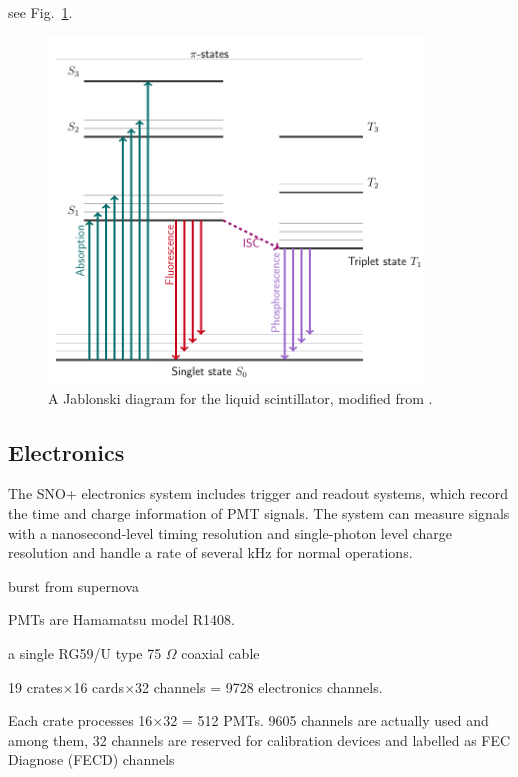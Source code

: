 see Fig.~\ref{jablonski}.
\begin{figure}[!htb]
	\centering
	\includegraphics[width=10cm]{jablonski.png}
	\caption{A Jablonski diagram for the liquid scintillator, modified from \cite{birks1965theory, knoll2010radiation}.}
	\label{jablonski}
\end{figure}











\subsection{Electronics}

The SNO+ electronics system includes trigger and readout systems, which record the time and charge information of PMT signals. The system can measure signals with a nanosecond-level timing resolution and single-photon level charge resolution and handle a rate of several kHz for normal operations.

burst 
from supernova









PMTs are Hamamatsu model R1408.


a single RG59/U type 75 $\Omega$ coaxial cable

19 crates$\times$16 cards$\times$32 channels = 9728 electronics channels.

Each crate processes 16$\times$32 = 512 PMTs.
9605 channels are actually used and among them, 32 channels are reserved for calibration devices and labelled as FEC Diagnose (FECD) channels



